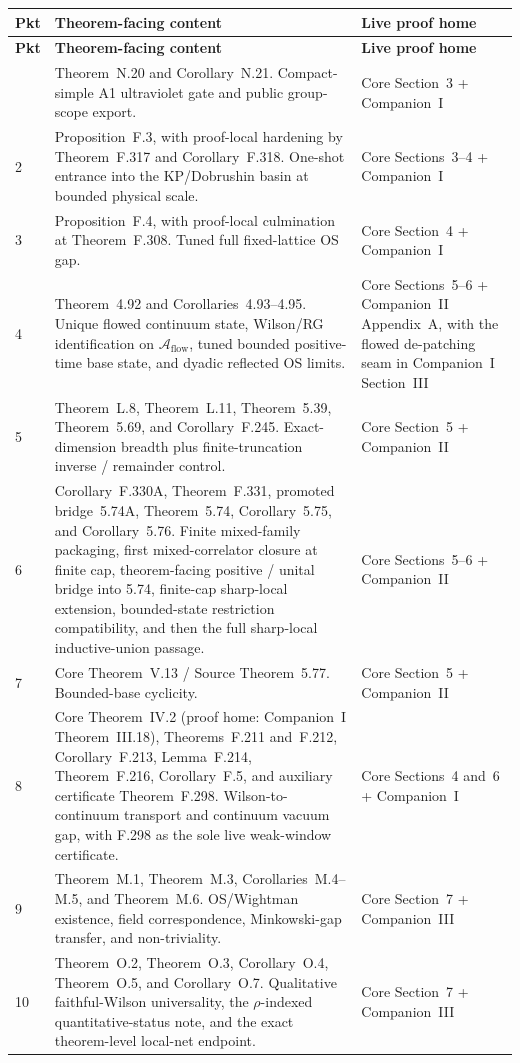 \documentclass[11pt]{article}
\begin{document}
\small
\setlength{\LTleft}{0pt}
\setlength{\LTright}{0pt}
\begin{longtable}{@{}C{0.8cm}L{9.5cm}L{4.0cm}@{}}
\toprule
\textbf{Pkt} & \textbf{Theorem-facing content} & \textbf{Live proof home}\\
\midrule
\endfirsthead
\toprule
\textbf{Pkt} & \textbf{Theorem-facing content} & \textbf{Live proof home}\\
\midrule
\endhead
\bottomrule
{} & Theorem~N.20 and Corollary~N.21. Compact-simple A1 ultraviolet gate and public group-scope export. & Core Section~3 + Companion~I\\
2 & Proposition~F.3, with proof-local hardening by Theorem~F.317 and Corollary~F.318. One-shot entrance into the KP/Dobrushin basin at bounded physical scale. & Core Sections~3--4 + Companion~I\\
3 & Proposition~F.4, with proof-local culmination at Theorem~F.308. Tuned full fixed-lattice OS gap. & Core Section~4 + Companion~I\\
4 & Theorem~4.92 and Corollaries~4.93--4.95. Unique flowed continuum state, Wilson/RG identification on $\mathcal A_{\mathrm{flow}}$, tuned bounded positive-time base state, and dyadic reflected OS limits. & Core Sections~5--6 + Companion~II Appendix~A, with the flowed de-patching seam in Companion~I Section~III\\
5 & Theorem~L.8, Theorem~L.11, Theorem~5.39, Theorem~5.69, and Corollary~F.245. Exact-dimension breadth plus finite-truncation inverse / remainder control. & Core Section~5 + Companion~II\\
6 & Corollary~F.330A, Theorem~F.331, promoted bridge~5.74A, Theorem~5.74, Corollary~5.75, and Corollary~5.76. Finite mixed-family packaging, first mixed-correlator closure at finite cap, theorem-facing positive / unital bridge into 5.74, finite-cap sharp-local extension, bounded-state restriction compatibility, and then the full sharp-local inductive-union passage. & Core Sections~5--6 + Companion~II\\
7 & Core Theorem~V.13 / Source Theorem~5.77. Bounded-base cyclicity. & Core Section~5 + Companion~II\\
8 & Core Theorem~IV.2 (proof home: Companion~I Theorem~III.18), Theorems~F.211 and~F.212, Corollary~F.213, Lemma~F.214, Theorem~F.216, Corollary~F.5, and auxiliary certificate Theorem~F.298. Wilson-to-continuum transport and continuum vacuum gap, with F.298 as the sole live weak-window certificate. & Core Sections~4 and~6 + Companion~I\\
9 & Theorem~M.1, Theorem~M.3, Corollaries~M.4--M.5, and Theorem~M.6. OS/Wightman existence, field correspondence, Minkowski-gap transfer, and non-triviality. & Core Section~7 + Companion~III\\
10 & Theorem~O.2, Theorem~O.3, Corollary~O.4, Theorem~O.5, and Corollary~O.7. Qualitative faithful-Wilson universality, the $\rho$-indexed quantitative-status note, and the exact theorem-level local-net endpoint. & Core Section~7 + Companion~III\\
\end{longtable}
\end{document}
